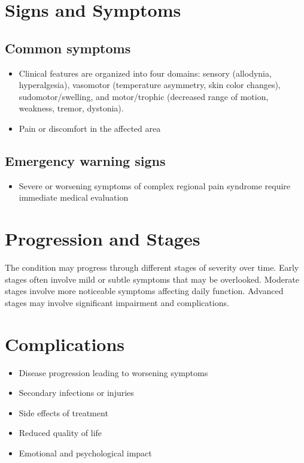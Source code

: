 \section{Signs and Symptoms}

\subsection{Common symptoms}
\begin{itemize}[noitemsep]
  \item Clinical features are organized into four domains: sensory (allodynia, hyperalgesia), vasomotor (temperature asymmetry, skin color changes), sudomotor/swelling, and motor/trophic (decreased range of motion, weakness, tremor, dystonia).
  \item Pain or discomfort in the affected area
  \end{itemize}

\subsection{Emergency warning signs}
\begin{itemize}[noitemsep]
  \item Severe or worsening symptoms of complex regional pain syndrome require immediate medical evaluation
\end{itemize}
\section{Progression and Stages}
The condition may progress through different stages of severity over time. Early stages often involve mild or subtle symptoms that may be overlooked. Moderate stages involve more noticeable symptoms affecting daily function. Advanced stages may involve significant impairment and complications.
\section{Complications}
\begin{itemize}[noitemsep]
  \item Disease progression leading to worsening symptoms
  \item Secondary infections or injuries
  \item Side effects of treatment
  \item Reduced quality of life
  \item Emotional and psychological impact
\end{itemize}

